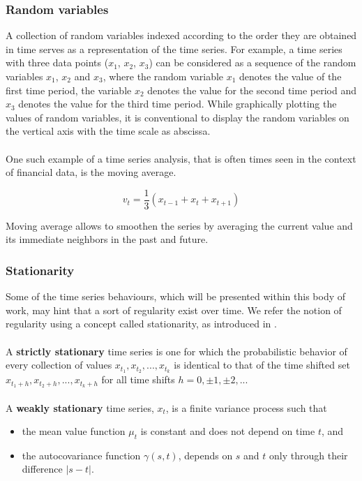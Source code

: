\subsubsection{Random variables}

A collection of random variables indexed according to the order they are obtained in time serves as a representation of the time series. For example, a time series with three data points ($x_1$, $x_2$, $x_3$) can be considered as a sequence of the random variables $x_1$, $x_2$ and $x_3$, where the random variable $x_1$ denotes the value of the first time period, the variable $x_2$ denotes the value for the second time period and $x_3$ denotes the value for the third time period. While graphically plotting the values of random variables, it is conventional to display the random variables on the vertical axis with the time scale as abscissa. \cite{shumway2000time}
\\
\\
One such example of a time series analysis, that is often times seen in the context of financial data, is the moving average. 

\begin{equation}
    v_t=\frac{1}{3}(x_{t-1}+x_t+x_{t+1})
\end{equation}

Moving average allows to smoothen the series by averaging the current value and its immediate neighbors in the past and future.


\subsubsection{Stationarity}

Some of the time series behaviours, which will be presented within this body of work, may hint that a sort of regularity exist over time.
We refer the notion of regularity using a concept called stationarity, as introduced in \cite{shumway2000time}.
\\
\\
A \textbf{strictly stationary} time series is one for which the probabilistic behavior of every collection of values
${x_{t_1}, x_{t_2}, ..., x_{t_k}}$
is identical to that of the time shifted set
${x_{t_1+h}, x_{t_2+h}, ..., x_{t_k+h}}$
for all time shifts $h=0,\pm1,\pm2,...$
\\
\\
A \textbf{weakly stationary} time series, $x_t$, is a finite variance process such that

\begin{itemize}
    \item the mean value function $\mu_t$ is constant and does not depend on time $t$, and
    \item the autocovariance function $\gamma(s, t)$, depends on $s$ and $t$ only through their difference $|s-t|$.
\end{itemize}

